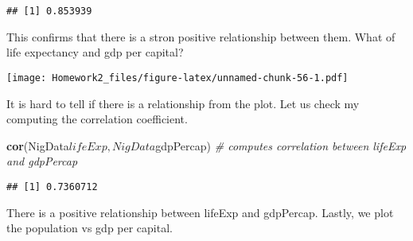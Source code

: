 \documentclass[]{article}
\newenvironment{Shaded}{\begin{snugshade}}{\end{snugshade}}
\newcommand{\KeywordTok}[1]{\textcolor[rgb]{0.13,0.29,0.53}{\textbf{{#1}}}}
\newcommand{\DataTypeTok}[1]{\textcolor[rgb]{0.13,0.29,0.53}{{#1}}}
\newcommand{\StringTok}[1]{\textcolor[rgb]{0.31,0.60,0.02}{{#1}}}
\newcommand{\CommentTok}[1]{\textcolor[rgb]{0.56,0.35,0.01}{\textit{{#1}}}}
\newcommand{\NormalTok}[1]{{#1}}
\begin{document}
\begin{verbatim}
## [1] 0.853939
\end{verbatim}

This confirms that there is a stron positive relationship between them.
What of life expectancy and gdp per capital?

\begin{Shaded}
\end{Shaded}

\texttt{[image: Homework2\_files/figure-latex/unnamed-chunk-56-1.pdf]}

It is hard to tell if there is a relationship from the plot. Let us
check my computing the correlation coefficient.

\begin{Shaded}
\begin{Highlighting}[]
\KeywordTok{cor}\NormalTok{(NigData$lifeExp,NigData$gdpPercap) }\CommentTok{# computes correlation between lifeExp and gdpPercap}
\end{Highlighting}
\end{Shaded}

\begin{verbatim}
## [1] 0.7360712
\end{verbatim}

There is a positive relationship between lifeExp and gdpPercap. Lastly,
we plot the population vs gdp per capital.

\begin{Shaded}
\end{Shaded}
\end{document}
